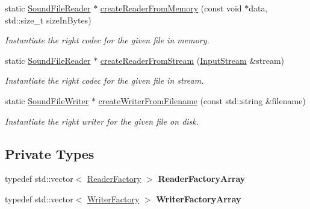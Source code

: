 \begin{DoxyCompactItemize}
static \mbox{\hyperlink{classsf_1_1_sound_file_reader}{Sound\+File\+Reader}} $\ast$ \mbox{\hyperlink{classsf_1_1_sound_file_factory_aee7a0ff1eace98d5325eaadc7d26d50c}{create\+Reader\+From\+Memory}} (const void $\ast$data, std\+::size\+\_\+t size\+In\+Bytes)
\begin{DoxyCompactList}\small\item\em Instantiate the right codec for the given file in memory. \end{DoxyCompactList}\item 
static \mbox{\hyperlink{classsf_1_1_sound_file_reader}{Sound\+File\+Reader}} $\ast$ \mbox{\hyperlink{classsf_1_1_sound_file_factory_a8d4b1f225b72a128ddba3be22f7ba5a2}{create\+Reader\+From\+Stream}} (\mbox{\hyperlink{classsf_1_1_input_stream}{Input\+Stream}} \&stream)
\begin{DoxyCompactList}\small\item\em Instantiate the right codec for the given file in stream. \end{DoxyCompactList}\item 
static \mbox{\hyperlink{classsf_1_1_sound_file_writer}{Sound\+File\+Writer}} $\ast$ \mbox{\hyperlink{classsf_1_1_sound_file_factory_a0702eb2e8a4a171ba80c7fbd04c4defc}{create\+Writer\+From\+Filename}} (const std\+::string \&filename)
\begin{DoxyCompactList}\small\item\em Instantiate the right writer for the given file on disk. \end{DoxyCompactList}\end{DoxyCompactItemize}
\subsection*{Private Types}
\begin{DoxyCompactItemize}
\item 
\mbox{\label{classsf_1_1_sound_file_factory_ac17e17e2acd7955119f54e32d45293a2}} 
typedef std\+::vector$<$ \mbox{\hyperlink{structsf_1_1_sound_file_factory_1_1_reader_factory}{Reader\+Factory}} $>$ {\bfseries Reader\+Factory\+Array}
\item 
\mbox{\label{classsf_1_1_sound_file_factory_a5ef91a693abbf9ebffcd86379ddb9930}} 
typedef std\+::vector$<$ \mbox{\hyperlink{structsf_1_1_sound_file_factory_1_1_writer_factory}{Writer\+Factory}} $>$ {\bfseries Writer\+Factory\+Array}
\end{DoxyCompactItemize}
